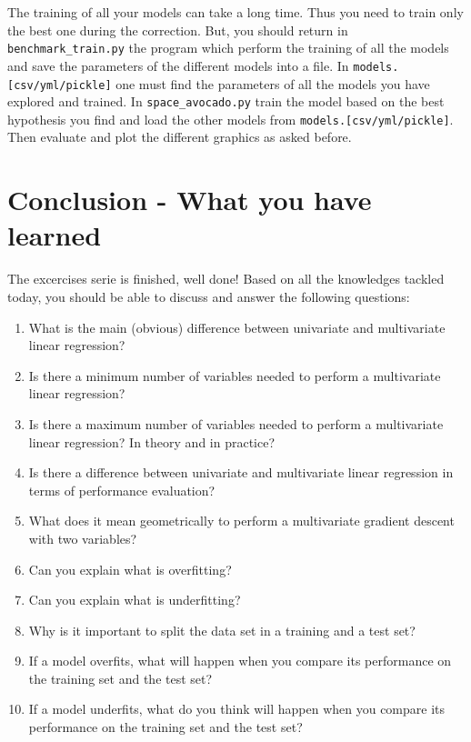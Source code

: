 \documentclass{42-en}
\begin{document}
The training of all your models can take a long time.
Thus you need to train only the best one during the correction.
But, you should return in \texttt{benchmark\_train.py} the program which perform the training of all the models and save the parameters of the different models into a file.
In \texttt{models.[csv/yml/pickle]} one must find the parameters of all the models you have explored and trained.
In \texttt{space\_avocado.py} train the model based on the best hypothesis you find and load the other models from \texttt{models.[csv/yml/pickle]}.
Then evaluate and plot the different graphics as asked before.


\newpage

\chapter{Conclusion - What you have learned}

The excercises serie is finished, well done!
Based on all the knowledges tackled today, you should be able to discuss and answer the following questions:

\begin{enumerate}
  \item What is the main (obvious) difference between univariate and multivariate linear regression?
  \item Is there a minimum number of variables needed to perform a multivariate linear regression?
  \item Is there a maximum number of variables needed to perform a multivariate linear regression?
        In theory and in practice?
  \item Is there a difference between univariate and multivariate linear regression in terms of performance evaluation?
  \item What does it mean geometrically to perform a multivariate gradient descent with two variables?
  \item Can you explain what is overfitting?
  \item Can you explain what is underfitting?
  \item Why is it important to split the data set in a training and a test set?
  \item If a model overfits, what will happen when you compare its performance on the training set and the test set?
  \item If a model underfits, what do you think will happen when you compare its performance on the training set and the test set?
\end{enumerate}
\end{document}

